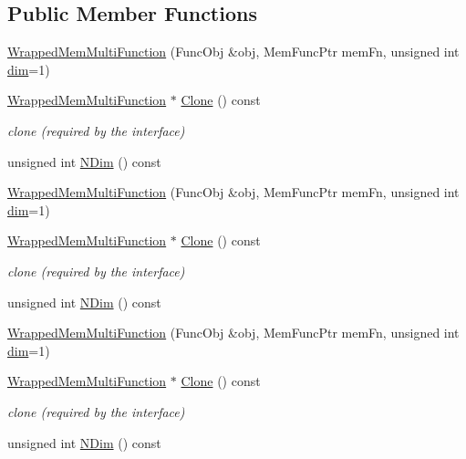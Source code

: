 \subsection*{Public Member Functions}
\begin{DoxyCompactItemize}
\item 
\mbox{\hyperlink{classROOT_1_1Math_1_1WrappedMemMultiFunction_a611b693f11a43c474d2292e7aadb0811}{Wrapped\+Mem\+Multi\+Function}} (Func\+Obj \&obj, Mem\+Func\+Ptr mem\+Fn, unsigned int \mbox{\hyperlink{adat__devel_2lib_2hadron_2irrep__util_8cc_a70b5e28b5bc3d1b63a7435c5fe50b837}{dim}}=1)
\item 
\mbox{\hyperlink{classROOT_1_1Math_1_1WrappedMemMultiFunction}{Wrapped\+Mem\+Multi\+Function}} $\ast$ \mbox{\hyperlink{classROOT_1_1Math_1_1WrappedMemMultiFunction_ab9f49fc9a151e8d921dbe9cb148c1fc8}{Clone}} () const
\begin{DoxyCompactList}\small\item\em clone (required by the interface) \end{DoxyCompactList}\item 
unsigned int \mbox{\hyperlink{classROOT_1_1Math_1_1WrappedMemMultiFunction_ae9aaf3de1f2e1e6e1c1310fccdb06009}{N\+Dim}} () const
\item 
\mbox{\hyperlink{classROOT_1_1Math_1_1WrappedMemMultiFunction_a611b693f11a43c474d2292e7aadb0811}{Wrapped\+Mem\+Multi\+Function}} (Func\+Obj \&obj, Mem\+Func\+Ptr mem\+Fn, unsigned int \mbox{\hyperlink{adat__devel_2lib_2hadron_2irrep__util_8cc_a70b5e28b5bc3d1b63a7435c5fe50b837}{dim}}=1)
\item 
\mbox{\hyperlink{classROOT_1_1Math_1_1WrappedMemMultiFunction}{Wrapped\+Mem\+Multi\+Function}} $\ast$ \mbox{\hyperlink{classROOT_1_1Math_1_1WrappedMemMultiFunction_ab9f49fc9a151e8d921dbe9cb148c1fc8}{Clone}} () const
\begin{DoxyCompactList}\small\item\em clone (required by the interface) \end{DoxyCompactList}\item 
unsigned int \mbox{\hyperlink{classROOT_1_1Math_1_1WrappedMemMultiFunction_ae9aaf3de1f2e1e6e1c1310fccdb06009}{N\+Dim}} () const
\item 
\mbox{\hyperlink{classROOT_1_1Math_1_1WrappedMemMultiFunction_a611b693f11a43c474d2292e7aadb0811}{Wrapped\+Mem\+Multi\+Function}} (Func\+Obj \&obj, Mem\+Func\+Ptr mem\+Fn, unsigned int \mbox{\hyperlink{adat__devel_2lib_2hadron_2irrep__util_8cc_a70b5e28b5bc3d1b63a7435c5fe50b837}{dim}}=1)
\item 
\mbox{\hyperlink{classROOT_1_1Math_1_1WrappedMemMultiFunction}{Wrapped\+Mem\+Multi\+Function}} $\ast$ \mbox{\hyperlink{classROOT_1_1Math_1_1WrappedMemMultiFunction_ab9f49fc9a151e8d921dbe9cb148c1fc8}{Clone}} () const
\begin{DoxyCompactList}\small\item\em clone (required by the interface) \end{DoxyCompactList}\item 
unsigned int \mbox{\hyperlink{classROOT_1_1Math_1_1WrappedMemMultiFunction_ae9aaf3de1f2e1e6e1c1310fccdb06009}{N\+Dim}} () const
\end{DoxyCompactItemize}

